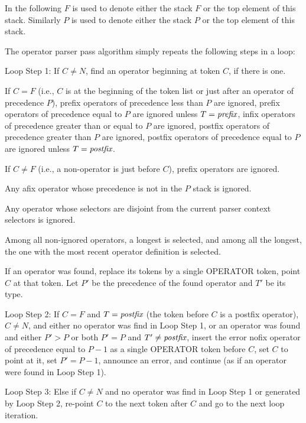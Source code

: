 \documentclass[12pt]{article}
\newenvironment{itemlist}[1][1.2in]%
	{\begin{list}{}{\setlength{\labelwidth}{#1}%
		        \setlength{\leftmargin}{\labelwidth}%
		        \addtolength{\leftmargin}{+0.2in}%
		        \renewcommand{\makelabel}[1]{##1\hfill}}}%
	{\end{list}}
\begin{document}
In the following $F$ is used to denote either the stack $F$ or
the top element of this stack.  Similarly $P$ is used to denote either the
stack $P$ or the top element of this stack.

The operator parser pass algorithm simply repeats the following
steps in a loop:
\begin{itemlist}[1.2in]
\item[Loop Step 1:]
If $C\neq N$, find an operator beginning at token $C$, if there is one.

If $C=F$ (i.e., $C$ is at the beginning of the token list or just after
an operator of precedence $P$),
prefix operators of precedence less than $P$ are ignored,
prefix operators of precedence equal to $P$ are ignored unless
$T=\mbox{\em prefix}$,
infix operators of precedence greater than or equal to $P$ are ignored,
postfix operators of precedence greater than $P$ are ignored,
postfix operators of precedence equal to $P$ are ignored unless
$T=\mbox{\em postfix}$.

If $C\neq F$ (i.e., a non-operator is just before $C$),
prefix operators are ignored.

Any afix operator whose precedence is not in the $P$ stack is ignored.

Any operator whose selectors are disjoint from the current parser context
selectors is ignored.

Among all non-ignored operators, a longest
is selected, and among all the longest, the one with the most recent
operator definition is selected.

If an operator was found, replace its tokens by a single
OPERATOR token, point $C$ at that token.  Let $P'$ be the precedence
of the found operator and $T'$ be its type.
\item[Loop Step 2:]
If $C=F$ and $T=\mbox{\em postfix}$
(the token before $C$ is a postfix operator),
$C\neq N$, and either no operator was find in Loop Step 1,
or an operator was found and either $P'>P$
or both $P'=P$ and $T'\not=\mbox{\em postfix}$,
insert the error nofix operator of precedence
equal to $P-1$ as a single
OPERATOR token before $C$, set $C$ to point at it,
set $P'=P-1$,
announce an error, and continue (as if an operator were found in
Loop Step 1).

\item[Loop Step 3:]
Else if $C\neq N$
and no operator was find in Loop Step 1 or generated by Loop Step 2,
re-point $C$ to the next token after $C$ and go to the next loop iteration.


\end{itemlist}
\end{document}
